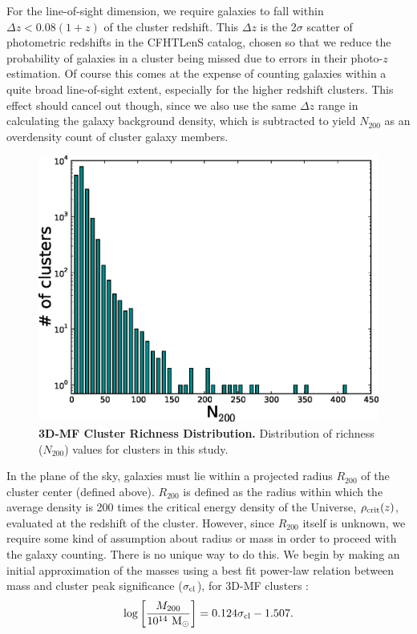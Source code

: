 For the line-of-sight dimension, we require galaxies to fall within $\Delta z < 0.08(1+z)$ of the cluster redshift. This $\Delta z$ is the 2$\sigma$ scatter of photometric redshifts in the \ac{CFHTLenS} catalog, chosen so that we reduce the probability of galaxies in a cluster being missed due to errors in their photo-$z$ estimation. Of course this comes at the expense of counting galaxies within a quite broad line-of-sight extent, especially for the higher redshift clusters. This effect should cancel out though, since we also use the same $\Delta z$ range in calculating the galaxy background density, which is subtracted to yield $N_{200}$ as an overdensity count of cluster galaxy members.

\begin{figure}
\begin{center}
\includegraphics[scale=0.6]{plots_ch3/N200histogram.eps}
\caption[\ac{3D-MF} Cluster Richness Distribution]{{\bf \ac{3D-MF} Cluster Richness Distribution.} Distribution of richness ($N_{200}$) values for clusters in this study.}
\label{plot:hist3}
\end{center}
\end{figure}

In the plane of the sky, galaxies must lie within a projected radius $R_{200}$ of the cluster center (defined above). $R_{200}$ is defined as the radius within which the average density is 200 times the critical energy density of the Universe, $\rho_{\rm crit}(z)$, evaluated at the redshift of the cluster. However, since $R_{200}$ itself is unknown, we require some kind of assumption about radius or mass in order to proceed with the galaxy counting. There is no unique way to do this. We begin by making an initial approximation of the masses using a best fit power-law relation between mass and cluster peak significance ($\sigma_{\rm cl}$), for \ac{3D-MF} clusters \citep{MMthesis11}:
\begin{equation}
\mathrm{log} \left[ \frac{M_{200}}{10^{14}\ {\rm M}_{\odot}} \right] = 0.124 \sigma_{\rm cl} - 1.507.
\end{equation}


